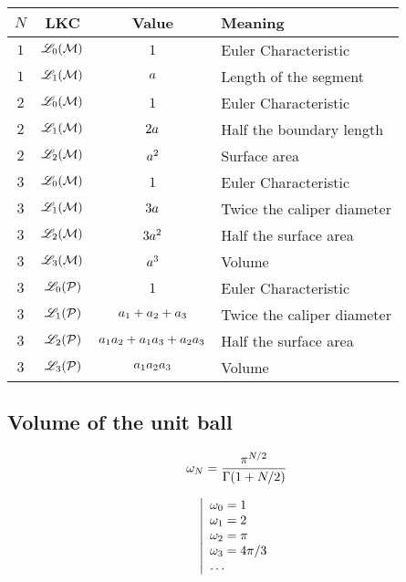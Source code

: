 \documentclass[12pt]{article}
\begin{document}
\begin{center}
  \begin{tabular}{c|c|c|l}
    $N$ & LKC & Value & Meaning \\
    \hline
    $1$ & $\mathscr{L}_0(\mathcal{M})$ & $1$ & Euler Characteristic \\
    $1$ & $\mathscr{L}_1(\mathcal{M})$ & $a$ & Length of the segment \\
    \hline
    $2$ & $\mathscr{L}_0(\mathcal{M})$ & $1$ & Euler Characteristic \\
    $2$ & $\mathscr{L}_1(\mathcal{M})$ & $2a$ & Half the boundary length \\
    $2$ & $\mathscr{L}_2(\mathcal{M})$ & $a^2$ & Surface area \\
    \hline
    $3$ & $\mathscr{L}_0(\mathcal{M})$ & $1$ & Euler Characteristic \\
    $3$ & $\mathscr{L}_1(\mathcal{M})$ & $3a$ & Twice the caliper diameter \\
    $3$ & $\mathscr{L}_2(\mathcal{M})$ & $3a^2$ & Half the surface area \\
    $3$ & $\mathscr{L}_3(\mathcal{M})$ & $a^3$ & Volume \\
    \hline
    $3$ & $\mathscr{L}_0(\mathcal{P})$ & $1$ & Euler Characteristic \\
    $3$ & $\mathscr{L}_1(\mathcal{P})$ & $a_1+a_2+a_3$ & Twice the caliper diameter \\
    $3$ & $\mathscr{L}_2(\mathcal{P})$ & $a_1a_2+a_1a_3+a_2a_3$ & Half the surface area \\
    $3$ & $\mathscr{L}_3(\mathcal{P})$ & $a_1a_2a_3$ & Volume \\
  \end{tabular}
\end{center}

\subsection{Volume of the unit ball}
\begin{minipage}{0.5\linewidth}
\begin{equation}\omega_N=\frac{\pi^{N/2}}{\Gamma(1+N/2)}\end{equation}
\end{minipage}
\begin{minipage}{0.5\linewidth}
\begin{equation}
  \left|
  \begin{array}{l}
    \omega_0=1 \\
    \omega_1=2 \\
    \omega_2=\pi \\
    \omega_3=4\pi/3 \\
    \dots
  \end{array}
  \right.
\end{equation}
\end{minipage}
\end{document}
